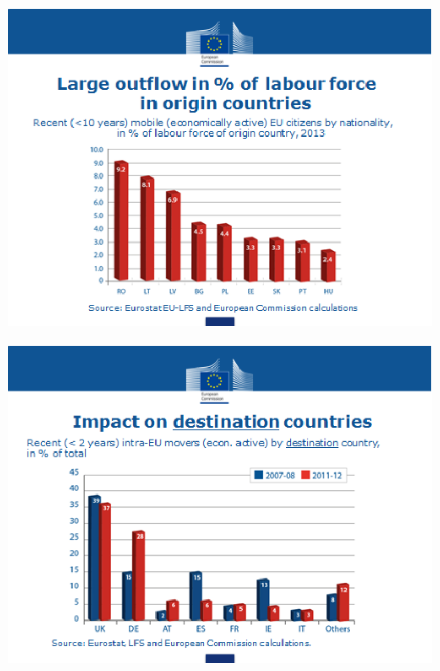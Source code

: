 \documentclass{beamer}
\begin{document}
\begin{frame}
  \begin{figure}
    \includegraphics[scale=.7]{eu_labour3.eps}
  \end{figure}
\end{frame}

\begin{frame}
  \begin{figure}
    \includegraphics[scale=.7]{eu_labour4.eps}
  \end{figure}
\end{frame}
\end{document}
